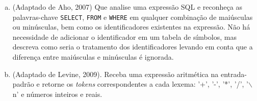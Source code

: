 \begin{enumerate}[a)]
Após a compilação do programa e supondo que o binário gerado
chama-se {\tt a.exe} (Windows) ou {\tt a.out} (Linux),
forneça um arquivo com código C como argumento
da seguinte forma no terminal (PowerShell, bash, ...):

\begin{verbatim}
# Windows
.\a.exe arquivo.c
# Linux
./a.out arquivo.c
\end{verbatim}

\item (Adaptado de Aho, 2007) Que analise uma expressão SQL e
  reconheça as palavras-chave {\tt SELECT}, {\tt FROM} e {\tt WHERE}
  em qualquer combinação de maiúsculas ou minúsculas, bem como os
  identificadores existentes na expressão.  Não há necessidade de
  adicionar o identificador em um tabela de símbolos, mas descreva
  como seria o tratamento dos identificadores levando em conta que a
  diferença entre maiúsculas e minúsculas é ignorada.

\item (Adaptado de Levine, 2009). Receba uma expressão aritmética
na entrada-padrão e retorne os {\em tokens} correspondentes a cada
lexema: '+', '-', '*', '/', '$\backslash$n' e números inteiros e reais.
\end{enumerate}
